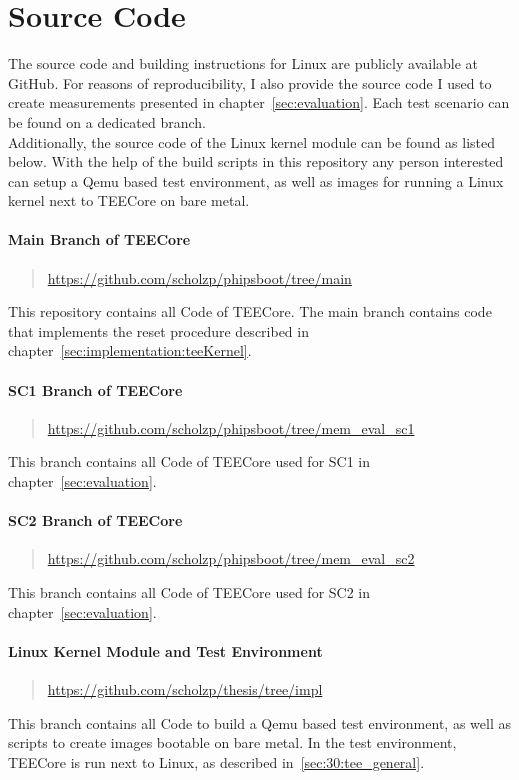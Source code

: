 \chapter{Source Code}

The source code and building instructions for Linux are publicly available at
GitHub. For reasons of reproducibility, I also provide the source code I used to
create measurements presented in chapter~\ref{sec:evaluation}. Each test
scenario can be found on a dedicated branch.\\
Additionally, the source code of the Linux kernel module can be found as listed
below. With the help of the build scripts in this repository any person
interested can setup a Qemu based test environment, as well as images for
running a Linux kernel next to TEECore on bare metal.

\subsubsection{Main Branch of TEECore}
\begin{quote}
  \url{https://github.com/scholzp/phipsboot/tree/main}
\end{quote}

\noindent
This repository contains all Code of TEECore. The main branch contains code that
implements the reset procedure described in
chapter~\ref{sec:implementation:teeKernel}.

\subsubsection{SC1 Branch of TEECore}
\begin{quote}
  \url{https://github.com/scholzp/phipsboot/tree/mem_eval_sc1}
\end{quote}

\noindent
This branch contains all Code of TEECore used for SC1 in
chapter~\ref{sec:evaluation}.

\subsubsection{SC2 Branch of TEECore}
\begin{quote}
  \url{https://github.com/scholzp/phipsboot/tree/mem_eval_sc2}
\end{quote}

\noindent
This branch contains all Code of TEECore used for SC2 in
chapter~\ref{sec:evaluation}.

\subsubsection{Linux Kernel Module and Test Environment}
\begin{quote}
  \url{https://github.com/scholzp/thesis/tree/impl}
\end{quote}

\noindent
This branch contains all Code to build a Qemu based test environment, as well as
scripts to create images bootable on bare metal. In the test environment,
TEECore is run next to Linux, as described in~\ref{sec:30:tee_general}.
